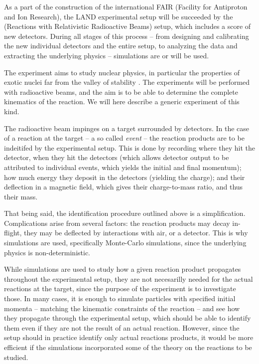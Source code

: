 As a part of the construction of the international FAIR (Facility for Antiproton and Ion Research), the LAND experimental setup will be succeeded by the \rtb{} (Reactions with Relativistic Radioactive Beams) setup, which includes a score of new detectors. During all stages of this process -- from designing and calibrating the new individual detectors and the entire setup, to analyzing the data and extracting the underlying physics -- simulations are or will be used. 

The \rtb{} experiment aims to study nuclear physics, in particular the properties of exotic nuclei far from the valley of stability \cite{r3b:online}. The experiments will be performed with radioactive beams, and the aim is to be able to determine the complete kinematics of the reaction. We will here describe a generic experiment of this kind.

The radioactive beam impinges on a target surrounded by detectors. In the case of a reaction at the target -- a so called \emph{event} -- the reaction products are to be indeitifed by the experimental setup. 
This is done by recording where they hit the detector, when they hit the detectors (which allows detector output to be attributed to individual events, which yields the initial and final momentum); how much energy they deposit in the detectors (yielding the charge); and their deflection in a magnetic field, which gives their charge-to-mass ratio, and thus their mass. 

That being said, the identification procedure outlined above is a simplification. Complications arise from several factors: the reaction products may decay in-flight, they may be deflected by interactions with air, or a detector. This is why simulations are used, specifically Monte-Carlo simulations, since the underlying physics is non-deterministic. 

While simulations are used to study how a given reaction product propagates throughout the experimental setup, they are not necesarilly needed for the actual reactions at the target, since the purpose of the experiment is to investigate those. 
In many cases, it is enough to simulate particles with specified initial momenta -- matching the kinematic constraints of the reaction -- and see how they propagate through the experimental setup, which should be able to identify them even if they are not the result of an actual reaction.
However, since the setup should in practice identify only actual reactions products, it would be more efficient if the simulations incorporated some of the theory on the reactions to be studied. 

